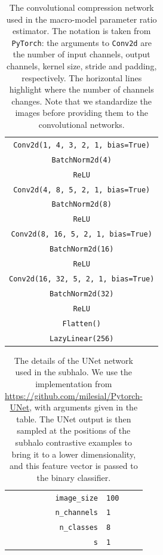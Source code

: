 \begin{subappendices}
\begin{table}
    \centering
    \begin{tabular}{c}
        \hline
        \texttt{Conv2d(1, 4, 3, 2, 1, bias=True)} \\
        \texttt{BatchNorm2d(4)} \\
        \texttt{ReLU} \\
        \hline
        \texttt{Conv2d(4, 8, 5, 2, 1, bias=True)} \\
        \texttt{BatchNorm2d(8)} \\
        \texttt{ReLU} \\
        \hline
        \texttt{Conv2d(8, 16, 5, 2, 1, bias=True)} \\
        \texttt{BatchNorm2d(16)} \\
        \texttt{ReLU} \\
        \hline
        \texttt{Conv2d(16, 32, 5, 2, 1, bias=True)} \\
        \texttt{BatchNorm2d(32)} \\
        \texttt{ReLU} \\
        \hline
        \texttt{Flatten()} \\
        \texttt{LazyLinear(256)} \\
        \hline
    \end{tabular}
    \caption{The convolutional compression network used in the macro-model parameter ratio estimator. The notation is taken from \texttt{PyTorch}: the arguments to \texttt{Conv2d} are the number of input channels, output channels, kernel size, stride and padding, respectively. The horizontal lines highlight where the number of channels changes. Note that we standardize the images before providing them to the convolutional networks.}
    \label{tab:anre-macro}
\end{table}
%
\begin{table}
    \centering
    \begin{tabular}{r l}
        \hline
        \texttt{image\_size} & \texttt{100} \\
        \texttt{n\_channels} & \texttt{1} \\
        \texttt{n\_classes} & \texttt{8}\\
        \texttt{s} & \texttt{1} \\
        \hline
    \end{tabular}
    \caption{The details of the UNet network used in the subhalo. We use the implementation from \url{https://github.com/milesial/Pytorch-UNet}, with arguments given in the table. The UNet output is then sampled at the positions of the subhalo contrastive examples to bring it to a lower dimensionality, and this feature vector is passed to the binary classifier.
    }
    \label{tab:anre-UNet}
\end{table}


\end{subappendices}
